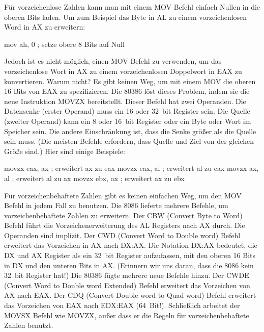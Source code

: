 F\"{u}r vorzeichenlose Zahlen kann man mit einem {\code MOV} Befehl
einfach Nullen in die oberen Bits laden. Um zum Beispiel das Byte in
AL zu einem vorzeichenlosen Word in AX zu erweitern:
\begin{AsmCodeListing}[numbers=left, firstnumber=last, frame=none]
      mov    ah, 0            ; setze obere 8 Bits auf Null
\end{AsmCodeListing}
Jedoch ist es nicht m\"{o}glich, einen {\code MOV} Befehl zu verwenden,
um das vorzeichenlose Wort in AX zu einem vorzeichenlosen Doppelwort
in EAX zu konvertieren. Warum nicht? Es gibt keinen Weg, um mit
einem {\code MOV} die oberen 16 Bits von EAX zu spezifizieren. Die
80386 l\"{o}st dieses Problem, indem sie die neue Instruktion {\code
MOVZX}  bereitstellt. Dieser Befehl hat
zwei Operanden. Die Datensenke (erster Operand) muss ein 16 oder
32~bit Register sein. Die Quelle (zweiter Operand) kann ein 8 oder
16~bit Register oder ein Byte oder Wort im Speicher sein. Die andere
Einschr\"{a}nkung ist, dass die Senke gr\"{o}{\ss}er als die Quelle sein muss.
(Die meisten Befehle erfordern, dass Quelle und Ziel von der
gleichen Gr\"{o}{\ss}e sind.) Hier sind einige Beispiele:
\begin{AsmCodeListing}[frame=none, numbers=left, firstnumber=last]
      movzx  eax, ax          ; erweitert ax zu eax
      movzx  eax, al          ; erweitert al zu eax
      movzx  ax, al           ; erweitert al zu ax
      movzx  ebx, ax          ; erweitert ax zu ebx
\end{AsmCodeListing}

F\"{u}r vorzeichenbehaftete Zahlen gibt es keinen einfachen Weg, um den
{\code MOV} Befehl in jedem Fall zu benutzen. Die 8086 lieferte
mehrere Befehle, um vorzeichenbehaftete Zahlen zu erweitern. Der
{\code CBW}  (Convert Byte to Word)
Befehl f\"{u}hrt die Vorzeichenerweiterung des AL Registers nach AX
durch. Die Operanden sind implizit. Der {\code CWD}
 (Convert Word to Double word) Befehl
erweitert das Vorzeichen in AX nach DX:AX\@. Die Notation DX:AX
bedeutet, die DX und AX Register als ein 32~bit Register
aufzufassen, mit den oberen 16 Bits in DX und den unteren Bits in
AX\@. (Erinnern wir uns daran, dass die 8086 kein 32~bit Register
hat!) Die 80386 f\"{u}gte mehrere neue Befehle hinzu. Der {\code CWDE}
 (Convert Word to Double word Extended)
Befehl erweitert das Vorzeichen von AX nach EAX\@. Der {\code CDQ}
 (Convert Double word to Quad word)
Befehl erweitert das Vorzeichen von EAX nach
EDX:EAX (64~Bit!). Schlie{\ss}lich arbeitet der
{\code MOVSX}  Befehl wie {\code
MOVZX}, au{\ss}er dass er die Regeln f\"{u}r vorzeichenbehaftete Zahlen
benutzt.

